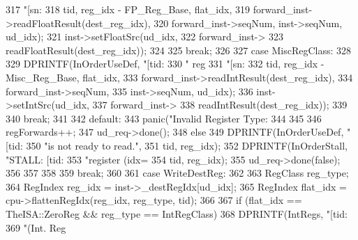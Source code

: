 \begin{DoxyCode}
{{{{{{{317                                     "[sn:%
318                                     tid, reg_idx - FP_Reg_Base, flat_idx,
319                                     forward_inst->readFloatResult(dest_reg_idx),
320                                     forward_inst->seqNum, inst->seqNum, ud_idx);
321                             inst->setFloatSrc(ud_idx,
322                                               forward_inst->
323                                               readFloatResult(dest_reg_idx));
324                         }
325                         break;
326 
327                       case MiscRegClass:
328                         {
329                             DPRINTF(InOrderUseDef, "[tid:%
330                                     " reg %
331                                     "[sn:%
332                                     tid, reg_idx - Misc_Reg_Base, flat_idx,
333                                     forward_inst->readIntResult(dest_reg_idx),
334                                     forward_inst->seqNum, 
335                                     inst->seqNum, ud_idx);
336                             inst->setIntSrc(ud_idx, 
337                                             forward_inst->
338                                             readIntResult(dest_reg_idx));
339                         }
340                         break;
341 
342                       default:
343                         panic("Invalid Register Type: %
344                     }
345 
346                     regForwards++;
347                     ud_req->done();
348                 } else {
349                     DPRINTF(InOrderUseDef, "[tid:%
350                             "is not ready to read.\n",
351                             tid, reg_idx);
352                     DPRINTF(InOrderStall, "STALL: [tid:%
353                             "register (idx=%
354                             tid, reg_idx);
355                     ud_req->done(false);
356                 }
357             }
358         }
359         break;
360 
361       case WriteDestReg:
362         {
363             RegClass reg_type;
364             RegIndex reg_idx = inst->_destRegIdx[ud_idx];
365             RegIndex flat_idx = cpu->flattenRegIdx(reg_idx, reg_type, tid);
366 
367             if (flat_idx == TheISA::ZeroReg && reg_type == IntRegClass) {
368                 DPRINTF(IntRegs, "[tid:%
369                         "(Int. Reg %
}}}}
\end{DoxyCode}
